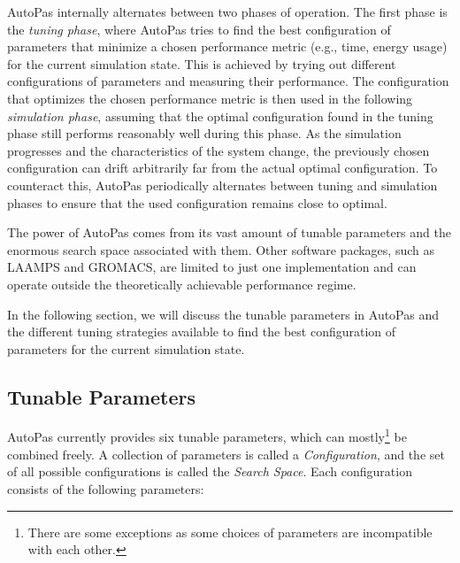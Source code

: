 AutoPas internally alternates between two phases of operation. The first phase is the \emph{tuning phase}, where AutoPas tries to find the best configuration of parameters that minimize a chosen performance metric (e.g., time, energy usage) for the current simulation state. This is achieved by trying out different configurations of parameters and measuring their performance. The configuration that optimizes the chosen performance metric is then used in the following \emph{simulation phase}, assuming that the optimal configuration found in the tuning phase still performs reasonably well during this phase.
As the simulation progresses and the characteristics of the system change, the previously chosen configuration can drift arbitrarily far from the actual optimal configuration. To counteract this, AutoPas periodically alternates between tuning and simulation phases to ensure that the used configuration remains close to optimal.

The power of AutoPas comes from its vast amount of tunable parameters and the enormous search space associated with them. Other software packages, such as LAAMPS and GROMACS, are limited to just one implementation and can operate outside the theoretically achievable performance regime.

In the following section, we will discuss the tunable parameters in AutoPas and the different tuning strategies available to find the best configuration of parameters for the current simulation state.

\subsection{Tunable Parameters}

AutoPas currently provides six tunable parameters, which can mostly\footnote{There are some exceptions as some choices of parameters are incompatible with each other.} be combined freely. A collection of parameters is called a \emph{Configuration}, and the set of all possible configurations is called the \emph{Search Space}. Each configuration consists of the following parameters:


